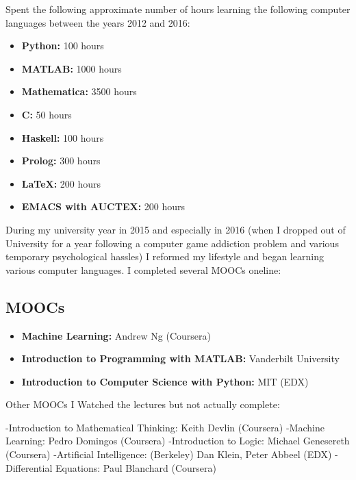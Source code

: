 \documentclass[paper=a4, fontsize=11pt]{scrartcl} %
\numberwithin{equation}{section} %
\numberwithin{figure}{section} %
\numberwithin{table}{section} %
\begin{document}
Spent the following approximate number of hours learning the following computer languages between the years 2012 and 2016:
\begin{itemize}
\item \textbf{Python:}             100 hours
\item \textbf{MATLAB:}            1000 hours
\item \textbf{Mathematica:}       3500 hours
\item \textbf{C:}                   50 hours
\item \textbf{Haskell:}            100 hours
\item \textbf{Prolog:}             300 hours
\item \textbf{LaTeX:}              200 hours
                 
\item \textbf{EMACS with AUCTEX:}  200 hours  

\end{itemize}

During my university year in 2015 and especially in 2016 (when I dropped out of University for a year following a computer game addiction problem and various temporary psychological hassles) I reformed my lifestyle and began learning various computer languages. I completed several MOOCs oneline:
\subsection{MOOCs}

\begin{itemize}

\item \textbf{Machine Learning:} Andrew Ng (Coursera)
  \item  \textbf{Introduction to Programming with MATLAB:} Vanderbilt University
  \item   \textbf{Introduction to Computer Science with Python:} MIT (EDX)

    

    
\end{itemize}

Other MOOCs I Watched the lectures but not actually complete:

-Introduction to Mathematical Thinking: Keith Devlin (Coursera)
-Machine Learning: Pedro Domingos (Coursera)
-Introduction to Logic: Michael Genesereth (Coursera)
-Artificial Intelligence: (Berkeley) Dan Klein, Peter Abbeel (EDX)
-Differential Equations: Paul Blanchard (Coursera)
\end{document}
